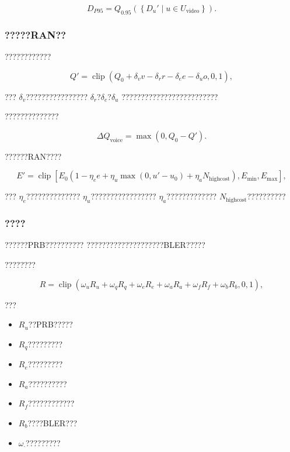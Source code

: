 \begin{equation}
D_{P95}
=
Q_{0.95}
\left(
\left\{
D_u'
\mid
u\in U_{\mathrm{video}}
\right\}
\right).
\label{eq:video_p95_reduced}
\end{equation}


\subsubsection*{?????RAN??}

????????????

\begin{equation}
Q'
=
\operatorname{clip}
\left(
Q_0
+
\delta_vv
-
\delta_rr
-
\delta_ee
-
\delta_uo,
0,
1
\right),
\label{eq:voice_quality_reduced}
\end{equation}

???
$\delta_v$????????????????
$\delta_r$?$\delta_e$?$\delta_u$
?????????????????????????

??????????????

\begin{equation}
\Delta Q_{\mathrm{voice}}
=
\max
\left(
0,
Q_0-Q'
\right).
\label{eq:voice_degradation_eval_reduced}
\end{equation}

??????RAN????

\begin{equation}
E'
=
\operatorname{clip}
\left[
E_0
\left(
1-\eta_ee
+
\eta_u\max(0,u'-u_0)
+
\eta_aN_{\mathrm{highcost}}
\right),
E_{\min},
E_{\max}
\right],
\label{eq:ran_energy_reduced}
\end{equation}

???
$\eta_e$??????????????
$\eta_u$?????????????????
$\eta_a$?????????????
$N_{\mathrm{highcost}}$??????????


\subsubsection*{????}

??????PRB??????????
????????????????????BLER?????

????????

\begin{equation}
R
=
\operatorname{clip}
\left(
\omega_uR_u
+
\omega_qR_q
+
\omega_eR_e
+
\omega_aR_a
+
\omega_fR_f
+
\omega_bR_b,
0,
1
\right),
\label{eq:total_risk_reduced}
\end{equation}

???

\begin{itemize}
    \item $R_u$??PRB?????
    \item $R_q$?????????
    \item $R_e$?????????
    \item $R_a$??????????
    \item $R_f$????????????
    \item $R_b$????BLER???
    \item $\omega_{\cdot}$?????????
\end{itemize}


